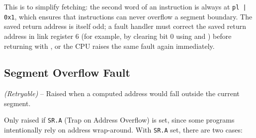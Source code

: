 This is to simplify fetching: the second word of an instruction is always at \texttt{pl | 0x1}, which ensures that
instructions can never overflow a segment boundary. The saved return address is itself odd; a fault handler must
correct the saved return address in link register 6 (for example, by clearing bit 0 using  and
) before returning with , or the CPU raises the same fault again immediately.

\subsection{Segment Overflow Fault}
\label{sec:segment-overflow-fault}

\textit{(Retryable)} -- Raised when a computed address would fall outside the
current segment.

Only raised if \texttt{SR.A} (Trap on Address Overflow) is set, since some programs intentionally rely on address
wrap-around. With \texttt{SR.A} set, there are two cases:

